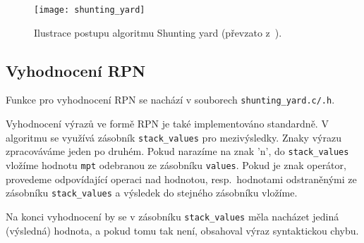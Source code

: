 \begin{figure}[ht]
    \centering 
    \texttt{[image: shunting\_yard]}
    \caption{Ilustrace postupu algoritmu Shunting yard (převzato z~\cite{bib:shunting_yard}).}\label{fig:shunting_yard}
\end{figure}

\subsection{Vyhodnocení RPN}
Funkce pro vyhodnocení RPN se nachází v souborech \verb|shunting_yard.c/.h|.

Vyhodnocení výrazů ve formě RPN je také implementováno standardně. V algoritmu se využívá zásobník \verb|stack_values| pro mezivýsledky. Znaky výrazu zpracováváme jeden po druhém. Pokud narazíme na znak 'n', do \verb|stack_values| vložíme hodnotu \verb|mpt| odebranou ze zásobníku \verb|values|. Pokud je znak operátor, provedeme odpovídající operaci nad hodnotou, resp.~hodnotami odstraněnými ze zásobníku \verb|stack_values| a výsledek do stejného zásobníku vložíme.

Na konci vyhodnocení by se v zásobníku \verb|stack_values| měla nacházet jediná (výsledná) hodnota, a pokud tomu tak není, obsahoval výraz syntaktickou chybu.